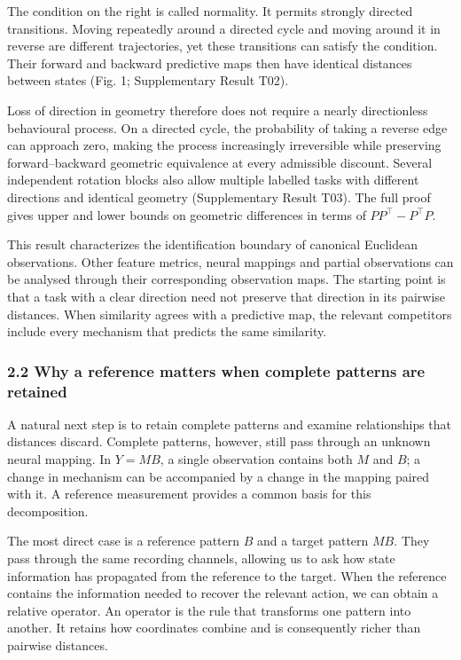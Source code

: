 \documentclass[11pt,a4paper]{article}
\begin{document}
The condition on the right is called normality. It permits strongly
directed transitions. Moving repeatedly around a directed cycle and
moving around it in reverse are different trajectories, yet these
transitions can satisfy the condition. Their forward and backward
predictive maps then have identical distances between states (Fig. 1;
Supplementary Result T02).

Loss of direction in geometry therefore does not require a nearly
directionless behavioural process. On a directed cycle, the probability
of taking a reverse edge can approach zero, making the process
increasingly irreversible while preserving forward–backward geometric
equivalence at every admissible discount. Several independent rotation
blocks also allow multiple labelled tasks with different directions and
identical geometry (Supplementary Result T03). The full proof gives
upper and lower bounds on geometric differences in terms of
\(PP^\top-P^\top P\).

This result characterizes the identification boundary of canonical
Euclidean observations. Other feature metrics, neural mappings and
partial observations can be analysed through their corresponding
observation maps. The starting point is that a task with a clear
direction need not preserve that direction in its pairwise distances.
When similarity agrees with a predictive map, the relevant competitors
include every mechanism that predicts the same similarity.

\subsubsection{2.2 Why a reference matters when complete patterns are
retained}\label{why-a-reference-matters-when-complete-patterns-are-retained}

A natural next step is to retain complete patterns and examine
relationships that distances discard. Complete patterns, however, still
pass through an unknown neural mapping. In \(Y=MB\), a single
observation contains both \(M\) and \(B\); a change in mechanism can be
accompanied by a change in the mapping paired with it. A reference
measurement provides a common basis for this decomposition.

The most direct case is a reference pattern \(B\) and a target pattern
\(MB\). They pass through the same recording channels, allowing us to
ask how state information has propagated from the reference to the
target. When the reference contains the information needed to recover
the relevant action, we can obtain a relative operator. An operator is
the rule that transforms one pattern into another. It retains how
coordinates combine and is consequently richer than pairwise distances.
\end{document}
